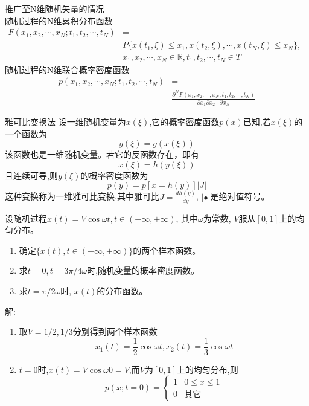 \begin{frame}
推广至N维随机矢量的情况\\
随机过程的N维累积分布函数
\begin{align*}
F(x_1,x_2,\cdots,x_N;t_1,t_2,\cdots,t_N)&=\\
&P\{x(t_1,\xi)\le x_1,x(t_2,\xi),\cdots,x(t_N,\xi)\le x_N\},&\\
&x_1,x_2,\cdots,x_N\in\mathbb{R},t_1,t_2,\cdots,t_N\in T
\end{align*}
随机过程的N维联合概率密度函数
\begin{align*}
p(x_1,x_2,\cdots,x_N;t_1,t_2,\cdots,t_N)&=\\
&\frac{\partial^N F(x_1,x_2,\cdots,x_N;t_1,t_2,\cdots,t_N)}{\partial x_1\partial x_2\cdots\partial x_N}
\end{align*}
\end{frame}

\begin{frame}{雅可比变换法}
设一维随机变量为$x(\xi)$,它的概率密度函数$p(x)$已知,若$x(\xi)$的一个函数为
\[y(\xi)=g(x(\xi)) \]
该函数也是一维随机变量。若它的反函数存在，即有
\[x(\xi)=h(y(\xi)) \]
且连续可导,则$y(\xi)$的概率密度函数为
\[p(y)=p[x=h(y)]|J| \]
这种变换称为一维雅可比变换,其中雅可比$J=\frac{dh(y)}{dy}$, $|\bullet|$是绝对值符号。
\end{frame}

\begin{frame}
\begin{example}
	设随机过程$x(t)=V\cos\omega t,t\in(-\infty,+\infty)$, 其中$\omega$为常数, $V$服从$[0,1]$上的均匀分布。
	\begin{enumerate}
		\item 确定$\{x(t),t\in(-\infty,+\infty)\}$的两个样本函数。
		\item 求$t=0,t=3\pi/4\omega$时,随机变量的概率密度函数。
		\item 求$t=\pi/2\omega$时, $x(t)$的分布函数。
	\end{enumerate}
\end{example}
\end{frame}

\begin{frame}
解:
\begin{enumerate}
	\item 取$V=1/2,1/3$分别得到两个样本函数
	\[x_1(t)=\frac{1}{2}\cos\omega t,x_2(t)=\frac{1}{3}\cos\omega t\]
	\item $t=0$时,$x(t)=V\cos\omega 0=V$,而$V$为$[0,1]$上的均匀分布,则
	$$
	p(x;t=0)=\begin{cases}
	1 & 0\le x\le 1\\
	0 &\text{其它}
	
\end{cases}
$$
\end{enumerate}
\end{frame}

